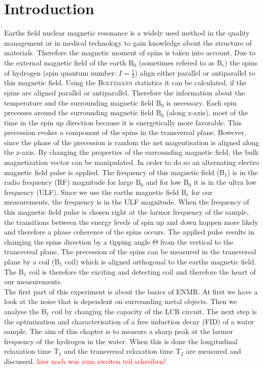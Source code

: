 \section{Introduction}
\label{sec:Introduction}
Earths field nuclear magnetic resonance is a widely used method in the quality management or in medical technology to gain knowledge about the structure of materials.
Therefore the magnetic moment of spins is taken into account.\newline
Due to the external magnetic field of the earth B$_0$ (sometimes refered to as B$_e$) the spins of hydrogen (spin quantum number: $I=\frac{1}{2}$) align either parallel or antiparallel to this magnetic field.
Using the \textsc{Boltzmann} statistics it can be calculated, if the spins are aligned parallel or antiparallel.
Therefore the information about the temperature and the surrounding magnetic field B$_0$ is necessary.
Each spin precesses around the surrounding magnetic field B$_0$ (along z-axis), most of the time in the spin up direction because it is energetically more favorable.
This precession evokes a component of the spins in the transversal plane.
However, since the phase of the precession is random the net magentisation is aligned along the z-axis.
By changing the properties of the surrounding magnetic field, the bulk magnetization vector can be manipulated.
In order to do so an alternating electro magnetic field pulse is applied.
The frequency of this magnetic field (B$_1$) is in the radio frequency (RF) magnitude for large B$_0$ and for low B$_0$ it is in the ultra low frequency (ULF).
Since we use the earths magnetic field B$_e$ for our measurements, the frequency is in the ULF magnitude.
When the frequency of this magnetic field pulse is chosen right at the larmor frequency of the sample, the transitions between the energy levels of spin up and down happen more likely and therefore a phase coherence of the spins occurs.
The applied pulse results in changing the spins direction by a tipping angle $\Theta$ from the vertical to the transversal plane.
The precession of the spins can be measured in the transversal plane by a coil (B$_1$ coil) which is aligned orthogonal to the earths magnetic field.
The B$_1$ coil is therefore the exciting and detecting coil and therefore the heart of our measurements. \\
The first part of this experiment is about the basics of ENMR.
At first we have a look at the noise that is dependent on surrounding metal objects.
Then we analyse the B$_1$ coil by changing the capacity of the LCR circuit.
The next step is the optimization and characterisation of a free induction decay (FID) of a water sample.
The aim of this chapter is to measure a sharp peak at the larmor frequency of the hydrogen in the water.
When this is done the longitudinal relaxation time T$_1$ and the transversal relaxation time T$_2$ are measured and discussed.
\textcolor{red}{hier noch was zum zweiten teil schreiben!}